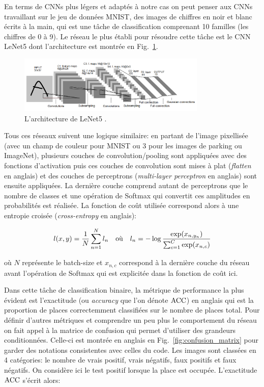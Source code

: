 \documentclass[12pt]{article}
\begin{document}
En terms de CNNs plus légers et adaptés à notre cas on peut penser aux CNNs travaillant sur le jeu de données MNIST, des images de chiffres en noir et blanc écrits à la main, qui est une tâche de classification comprenant 10 familles (les chiffres de 0 à 9). Le réseau le plus établi pour résoudre cette tâche est le CNN LeNet5 \citep{lecun1998} dont l'architecture est montrée en Fig.~\ref{fig:lenet5}.

\begin{figure}[htbp]
    \centering
    \includegraphics[width=0.8\textwidth]{figures/networks/lenet5.png}
    \caption{L'architecture de LeNet5 \citep{lecun1998}.}
    \label{fig:lenet5}
\end{figure}

Tous ces réseaux suivent une logique similaire: en partant de l'image pixellisée (avec un champ de couleur pour MNIST ou 3 pour les images de parking ou ImageNet), plusieurs couches de convolution/pooling sont appliquées avec des fonctions d'activation puis ces couches de convolution sont mises à plat (\textit{flatten} en anglais) et des couches de perceptrons (\textit{multi-layer perceptron} en anglais) sont ensuite appliquées. La dernière couche comprend autant de perceptrons que le nombre de classes et une opération de Softmax qui convertit ces amplitudes en probabilités est réalisée. La fonction de coût utilisée correspond alors à une entropie croisée (\textit{cross-entropy} en anglais):

\begin{equation}
    l(x, y) = \frac{1}{N} \sum_{n=1}^N l_n \qq{où} l_n = - \log \frac{\exp(x_{n, y_n})}{\sum_{c=1}^C \exp(x_{n,c})}
\end{equation}

\noindent où $N$ représente le batch-size et $x_{n, c}$ correspond à la dernière couche du réseau avant l'opération de Softmax qui est explicitée dans la fonction de coût ici.

Dans cette tâche de classification binaire, la métrique de performance la plus évident est l'exactitude (ou \textit{accuracy} que l'on dénote $\mathrm{ACC}$) en anglais qui est la proportion de places correctemment classifiées sur le nombre de places total. Pour définir d'autres métriques et comprendre un peu plus le comportement du réseau on fait appel à la matrice de confusion qui permet d'utiliser des grandeurs conditionnées. Celle-ci est montrée en anglais en Fig.~\ref{fig:confusion_matrix} pour garder des notations consistentes avec celles du code. Les images sont classées en 4 catégories: le nombre de vrais positif, vrais négatifs, faux positifs et faux négatifs. On considère ici le test positif lorsque la place est occupée. L'exactitude $\mathrm{ACC}$ s'écrit alors:
\end{document}
